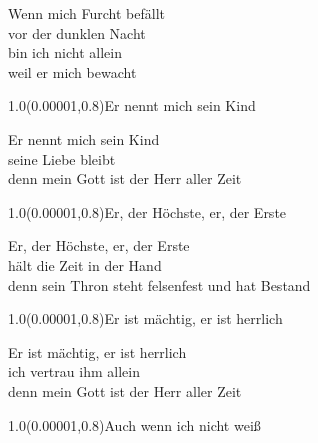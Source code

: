 \documentclass[aspectratio=169]{beamer}
\begin{document}
\begin{frame}
\centering
\color{white}
\huge{Wenn mich Furcht befällt} \\
\huge{vor der dunklen Nacht} \\
\huge{bin ich nicht allein} \\
\huge{weil er mich bewacht} \\

\begin{textblock}{1.0}(0.00001,0.8)\color{gray}\normalsize{Er nennt mich sein Kind}\end{textblock}
\end{frame}

\begin{frame}
\centering
\color{white}
\huge{Er nennt mich sein Kind} \\
\huge{seine Liebe bleibt} \\
\huge{denn mein Gott ist der Herr aller Zeit} \\

\begin{textblock}{1.0}(0.00001,0.8)\color{gray}\normalsize{Er, der Höchste, er, der Erste}\end{textblock}
\end{frame}

\begin{frame}
\centering
\color{white}
\huge{Er, der Höchste, er, der Erste} \\
\huge{hält die Zeit in der Hand} \\
\huge{denn sein Thron steht felsenfest und hat Bestand} \\

\begin{textblock}{1.0}(0.00001,0.8)\color{gray}\normalsize{Er ist mächtig, er ist herrlich}\end{textblock}
\end{frame}

\begin{frame}
\centering
\color{white}
\huge{Er ist mächtig, er ist herrlich} \\
\huge{ich vertrau ihm allein} \\
\huge{denn mein Gott ist der Herr aller Zeit} \\

\begin{textblock}{1.0}(0.00001,0.8)\color{gray}\normalsize{Auch wenn ich nicht weiß}\end{textblock}
\end{frame}
\end{document}
